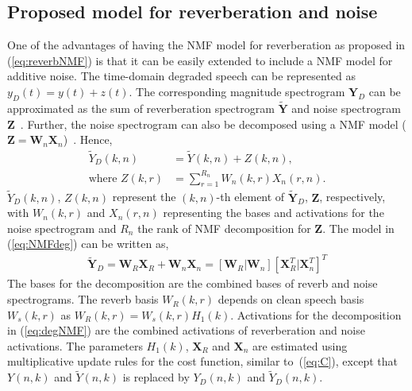 \subsection{Proposed model for reverberation and noise}
One of the advantages of having the NMF model for reverberation as proposed in (\ref{eq:reverbNMF}) is that it can be easily extended to include a NMF model for additive noise. The time-domain degraded speech can be represented as $y_D(t)=y(t)+z(t)$. The corresponding magnitude spectrogram $\mathbf{Y}_D$ can be approximated as the sum of reverberation spectrogram $\tilde{\mathbf{Y}}$ and noise spectrogram $\mathbf{Z}$~\cite{baby2015coupled,baby2016phd,baby2016supervised}. Further, the noise spectrogram can also be decomposed using a NMF model ($\mathbf{Z}=\mathbf{W}_n\mathbf{X}_n$)~\cite{wilson2008speech}. Hence,
\begin{align}
\tilde{Y}_D(k,n) &= \tilde{Y}(k,n)+Z(k,n) \text{,}\label{eq:NMFdeg}\\
\text{where }Z(k,r)&=\sum_{r=1}^{R_n} W_{n}(k,r)X_{n}(r,n)\text{.}
\end{align}
$\tilde{Y}_D(k,n)$, $Z(k,n)$ represent the $(k,n)$-th element of ${\tilde{\mathbf{Y}}_D}$, $\mathbf{Z}$, respectively, with $W_{n}(k,r)$ and $X_{n}(r,n)$ representing the bases and activations for the noise spectrogram and $R_n$ the rank of NMF decomposition for $\mathbf{Z}$. The model in (\ref{eq:NMFdeg}) can be written as,
\begin{align}
\tilde{\mathbf{Y}}_D = \mathbf{W}_R\mathbf{X}_R + \mathbf{W}_n\mathbf{X}_n = [\mathbf{W}_R | \mathbf{W}_n] [\mathbf{X}_R^T | \mathbf{X}_n^T]^T
\label{eq:degNMF}
\end{align}
The bases for the decomposition are the combined bases of reverb and noise spectrograms. The reverb basis $W_R(k,r)$ depends on clean speech basis $W_s(k,r)$ as $W_R(k,r)=W_s(k,r)H_1(k)$. Activations for the decomposition in (\ref{eq:degNMF}) are the combined activations of reverberation and noise activations. The parameters $H_1(k)$, $\mathbf{X}_R$ and $\mathbf{X}_n$ are estimated using multiplicative update rules for the cost function, similar to~(\ref{eq:C}), except that $Y(n,k)$ and $\tilde{Y}(n,k)$ is replaced by $Y_D(n,k)$ and $\tilde{Y}_D(n,k)$.
